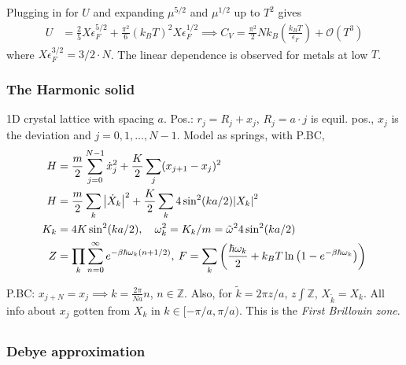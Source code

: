 \documentclass[a4paper, english, 12pt]{article}
\newcommand{\eps}{\epsilon}
\newcommand{\closed}[1]{\left( #1 \right)}
\begin{document}
\begin{multicols*}{2}
Plugging in for $U$ and expanding $\mu^{5/2}$ and $\mu^{1/2}$ up to $T^2$ gives 
\begin{align*}
    U &= \frac{2}{5}X\eps_F^{5/2} + \frac{\pi^2}{6}(k_B T)^2 X\eps_F^{1/2} \implies C_V = \frac{\pi^2}{2} Nk_B \closed{\frac{k_B T}{\eps_F}} + \mathcal{O}(T^3)
\end{align*}
where $X\eps_F^{3/2}=3/2\cdot N $. The linear dependence is observed for metals at low $T$. 



\subsubsection*{\scriptsize The Harmonic solid}
1D crystal lattice with spacing $a$. Pos.: $r_j = R_j + x_j$, $R_j=a\cdot j$ is equil. pos., $x_j$ is the deviation and $j=0,1,\dots,N-1$. Model as springs, with P.BC, 
\begin{align*}
    H &= \frac{m}{2}\sum_{j=0}^{N-1} \dot{x}_j^2 + \frac{K}{2} \sum_j (x_{j+1}-x_j)^2 \\ 
    H &= \frac{m}{2} \sum_k \abs{\dot{X}_k}^2 + \frac{K}{2} \sum_k 4\sin^2(ka/2) \abs{X_k}^2 \\
    K_k &= 4K \sin^2(ka/2),\quad \omega_k^2 = K_k/m = \tilde{\omega}^2 4\sin^2(ka/2) \\
    Z &= \prod_k \sum_{n=0}^\infty e^{-\beta \hbar \omega_k (n+1/2)},\: F= \sum_k \closed{\frac{\hbar \omega_k}{2} + k_B T \ln\closed{1-e^{-\beta \hbar \omega_k}} } \\
\end{align*}

P.BC: $x_{j+N}=x_j\implies k = \frac{2\pi}{Na}n$, $n\in\mathbb{Z}$. Also, for $\tilde{k}=2\pi z/a$, $z\int\mathbb{Z}$, $X_{\tilde{k}}=X_k$. All info about $x_j$ gotten from $X_k$ in $k\in[-\pi/a,\pi/a)$. This is the \textit{First Brillouin zone}.
\begin{align*}
\end{align*}


\subsubsection*{\scriptsize Debye approximation}


\end{multicols*}
\end{document}
